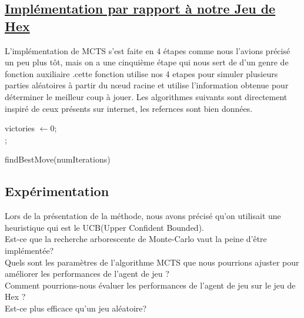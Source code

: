 \documentclass[12pt]{article}
\begin{document}
\subsection{\underline{Implémentation par rapport à notre Jeu de Hex}}
L'implémentation de MCTS s'est faite en 4 étapes comme nous l'avions précisé un peu plus tôt, mais on a une cinquième étape qui nous sert de d'un genre de fonction auxiliaire .cette fonction utilise nos 4 etapes  pour simuler plusieurs parties aléatoires à partir du nœud racine et utilise l'information obtenue pour déterminer le meilleur coup à jouer.
Les algorithmes suivants sont directement inspiré de ceux présents sur internet, les refernces sont bien données.
\begin{algorithm}
\SetAlgoLined
\DontPrintSemicolon
{}


victories $\gets 0$;\\;

\caption{findBestMove(numIterations)}
\end{algorithm}
\subsection{Expérimentation}
Lors de la présentation de la méthode, nous avons précisé qu'on utilisait une heuristique qui est le UCB(Upper Confident Bounded).\\
Est-ce que la recherche arborescente de Monte-Carlo vaut la peine d’être implémentée?\\
Quels sont les paramètres de l'algorithme MCTS que nous pourrions ajuster pour améliorer les performances de l'agent de jeu ?\\
Comment pourrions-nous évaluer les performances de l'agent de jeu sur le jeu de Hex ? \\
Est-ce plus eﬃcace qu’un jeu aléatoire?
\end{document}

